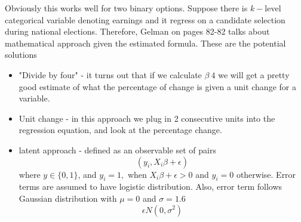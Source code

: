 \documentclass{article}
\begin{document}
Obviously this works well for two binary options. Suppose there is $k-$level categorical variable denoting earnings and it regress on a candidate selection during national elections. Therefore, Gelman on pages 82-82 talks about mathematical approach given the estimated formula. These are the potential solutions
\begin{itemize}
\item "Divide by four" - it turns out that if we calculate $\beta \ 4 $ we will get a pretty good estimate of what the percentage of change is given a unit change for a variable.
\item Unit change - in this approach we plug in 2 consecutive units into the regression equation, and look at the percentage change.
\item latent approach - defined as an observable set of pairs
\begin{equation}
(y_i, X_i\beta + \epsilon)
\end{equation}
where $y \in \{0,1\}$, and $y_i = 1,$ when $X_i\beta + \epsilon >0$ and $y_i = 0$ otherwise. Error terms are assumed to have logistic distribution. Also, error term follows Gaussian distribution with $\mu = 0$ and $\sigma = 1.6$
\begin{equation}
 \epsilon  N(0, \sigma^2)
\end{equation}
\end{itemize}
\end{document}

